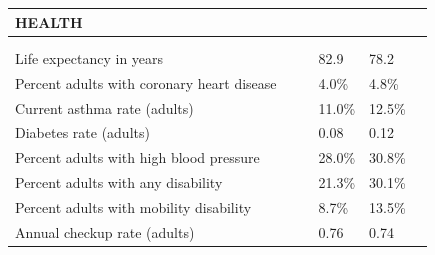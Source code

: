 \documentclass[9pt]{report}
\begin{document}
\newpage
\setlength{\tabcolsep}{.01in} %
\begin{tabular}{p{.10in}p{.10in}p{.10in}p{3.7in}>{\hfill}p{.85in}>{\hfill}p{.85in}>{\hfill}p{.85in}>{\hfill}p{.85in}p{0.1in}}
\multicolumn{9}{l}{\parbox{7.1in}{\raggedright{\large{\strut\textbf{HEALTH}\strut}}}} \\ 
\hline
\multicolumn{4}{l}{\parbox{3.5in}{\raggedright{\textbf{}}}} & \multicolumn{1}{r}{\parbox{.85in}{\strut\raggedleft{\textbf{}\strut}}} & \multicolumn{1}{r}{\parbox{.85in}{\strut\raggedleft{\textbf{}\strut}}} & \multicolumn{1}{r}{\parbox{.85in}{\strut{}}} & \multicolumn{1}{r}{\parbox{.85in}{\strut{}}} & \\ 
\multicolumn{9}{l}{} \\ 
\multicolumn{4}{l}{\parbox{3.6in}{\strut\raggedright{{Life expectancy in years}}\strut}} &  &  & 82.9 & 78.2 & \multicolumn{1}{l}{}  \\ 
\multicolumn{4}{l}{\parbox{3.6in}{\strut\raggedright{{Percent adults with coronary heart disease}}\strut}} &  &  & 4.0\% & 4.8\% & \multicolumn{1}{l}{}  \\ 
\multicolumn{4}{l}{\parbox{3.6in}{\strut\raggedright{{Current asthma rate (adults)}}\strut}} &  &  & 11.0\% & 12.5\% & \multicolumn{1}{l}{}  \\ 
\multicolumn{4}{l}{\parbox{3.6in}{\strut\raggedright{{Diabetes rate (adults)}}\strut}} &  &  & 0.08 & 0.12 & \multicolumn{1}{l}{}  \\ 
\multicolumn{4}{l}{\parbox{3.6in}{\strut\raggedright{{Percent adults with high blood pressure}}\strut}} &  &  & 28.0\% & 30.8\% & \multicolumn{1}{l}{}  \\ 
\multicolumn{4}{l}{\parbox{3.6in}{\strut\raggedright{{Percent adults with any disability}}\strut}} &  &  & 21.3\% & 30.1\% & \multicolumn{1}{l}{}  \\ 
\multicolumn{4}{l}{\parbox{3.6in}{\strut\raggedright{{Percent adults with mobility disability}}\strut}} &  &  & 8.7\% & 13.5\% & \multicolumn{1}{l}{}  \\ 
\multicolumn{4}{l}{\parbox{3.6in}{\strut\raggedright{{Annual checkup rate (adults)}}\strut}} &  &  & 0.76 & 0.74 & \multicolumn{1}{l}{}  \\ 

\end{tabular}
\end{document}
